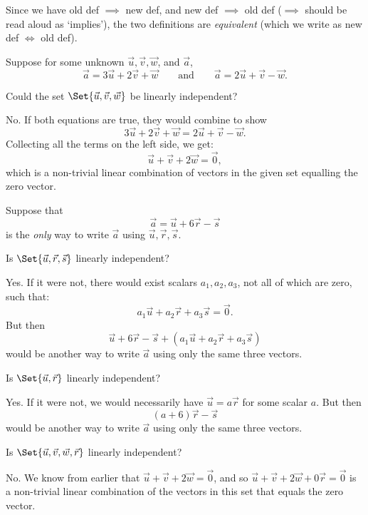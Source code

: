 \documentclass{problemset}
\begin{document}
	Since we have old def $\implies$ new def, and new def $\implies$ old def 
	($\implies$ should be read aloud as `implies'), the two definitions
	are \emph{equivalent} (which we write as new def $\iff$ old def).


	\question
	Suppose for some unknown $\vec u, \vec v, \vec w$, and $\vec a$,
	\[
		\vec a = 3\vec u+2\vec v +\vec w\qquad \text{and}\qquad 
		\vec a = 2\vec u+\vec v -\vec w.
	\]
	\begin{parts}
		\item Could the set $\Set{\vec u,\vec v,\vec w}$ be linearly
		independent?
			\begin{solution}
				No. If both equations are true, they would combine to show
				\[
					3\vec u+2\vec v +\vec w = 2\vec u+\vec v -\vec w.
				\]
				Collecting all the terms on the left side, we get:
				\[
					\vec u + \vec v + 2\vec w = \vec 0,
				\]
				which is a non-trivial linear combination of vectors in the given
				set equalling the zero vector.
			\end{solution}
	\end{parts}
	Suppose that
	\[
		\vec a = \vec u+6\vec r-\vec s
	\]
	is the \emph{only} way to write $\vec a$ using $\vec u,\vec r,\vec s$.
	\begin{parts}[resume]
		\item Is $\Set{\vec u,\vec r,\vec s}$ linearly independent?
			\begin{solution}
				Yes. If it were not, there would exist scalars $a_1, a_2, a_3$, 
				not all of which are zero, such that:
				\[
					a_1 \vec u + a_2 \vec r + a_3\vec s = \vec 0.
				\]
				But then 
				\[
					\vec u+6\vec r-\vec s + (a_1 \vec u + a_2 \vec r + a_3\vec s)
				\]
				would be another way to write $\vec a$ using only the same three
				vectors. 
			\end{solution}
		\item Is $\Set{\vec u,\vec r}$ linearly independent?
			\begin{solution}
				Yes. If it were not, we would necessarily have $\vec u = a \vec r$
				for some scalar $a$. But then 
				\[
					(a + 6) \vec r - \vec s
				\]
				would be another way to write $\vec a$ using only the same three
				vectors. 
			\end{solution}
		\item Is $\Set{\vec u,\vec v,\vec w,\vec r}$ linearly independent?
			\begin{solution}
				No. We know from earlier that $\vec u+\vec v+2\vec w=\vec 0$, and
				so $\vec u+\vec v+2\vec w+0\vec r=\vec 0$ is a non-trivial linear 
				combination of the vectors in this set that equals the zero vector.
			\end{solution}
	\end{parts}
\end{document}
